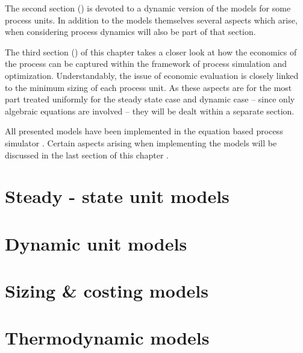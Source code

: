     The second section () is devoted to a dynamic version of the models for some process units.
    In addition to the models themselves several aspects which arise, when considering process dynamics will also be part
    of that section.

    The third section () of this chapter takes a closer look at how the economics of the process
    can be captured within the framework of process simulation and optimization. Understandably, the issue of economic
    evaluation is closely linked to the minimum sizing of each process unit. As these aspects are for the most
    part treated uniformly for the steady state case and dynamic case -- since only algebraic equations are involved --
    they will be dealt within a separate section.

    All presented models have been implemented in the equation based process simulator \gproms. Certain aspects arising when
    implementing the models will be discussed in the last section of this chapter .


    \section{Steady - state unit models}
    \label{sec:mathpro:steady}
        

    \section{Dynamic unit models}
    \label{sec:mathpro:dynamic}
        

    \section{Sizing \& costing models}
    \label{sec:mathpro:econ}
        

    \section{Thermodynamic models}
        \label{sec:mathpro:thermo}

